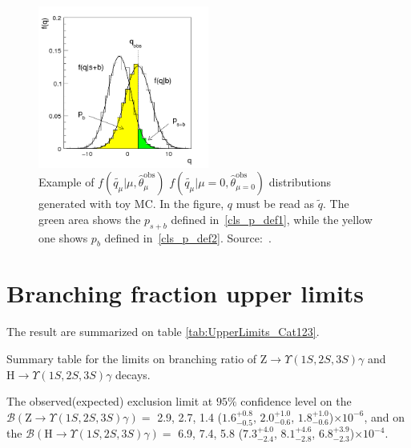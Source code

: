 \begin{figure}[htbp]
  \centering
  \includegraphics[width=0.5\textwidth,keepaspectratio]{figures/cls/qtevDist.png}
  \caption{Example of $f(\tilde{q_{\mu}} \vert \mu, \hat{\theta}_{\mu}^{\text{obs}})$ $f(\tilde{q_{\mu}} \vert \mu=0, \hat{\theta}_{\mu = 0}^{\text{obs}})$ distributions generated with toy MC. In the figure, $q$ must be read as $\tilde{q}$. The green area shows the $p_{s+b}$ defined in~\ref{cls_p_def1}, while the yellow one shows $p_{b}$ defined in~\ref{cls_p_def2}. Source:~\cite{asymptotic_cls}.}
  \label{qtevDist}
\end{figure}

\section{Branching fraction upper limits}
\label{sec:results}
The result are summarized on table \ref{tab:UpperLimits_Cat123}.

\begin{table}[ht]
\begin{center}
% 

\caption{Summary table for the limits on branching ratio of $\mathrm{Z}\to\Upsilon(1S,2S,3S)\gamma$ and $\mathrm{H}\to\Upsilon(1S,2S,3S)\gamma$ decays.}
\label{tab:UpperLimits_Cat123}
\end{center}
\end{table}

The observed(expected) exclusion limit at $95\%$ confidence level on the $\mathcal{B}(\mathrm{Z}\to\Upsilon(1S,2S,3S)\gamma)=$ 2.9, 2.7, 1.4 ($1.6^{+0.8}_{-0.5}$,  $2.0^{+1.0}_{-0.6}$, $1.8^{+1.0}_{-0.6}$)$\times 10^{-6}$, and on the $\mathcal{B}(\mathrm{H}\to\Upsilon(1S,2S,3S)\gamma)=$ 6.9, 7.4, 5.8 ($7.3^{+4.0}_{-2.4}$,  $8.1^{+4.6}_{-2.8}$, $6.8^{+3.9}_{-2.3}$)$\times 10^{-4}$.

